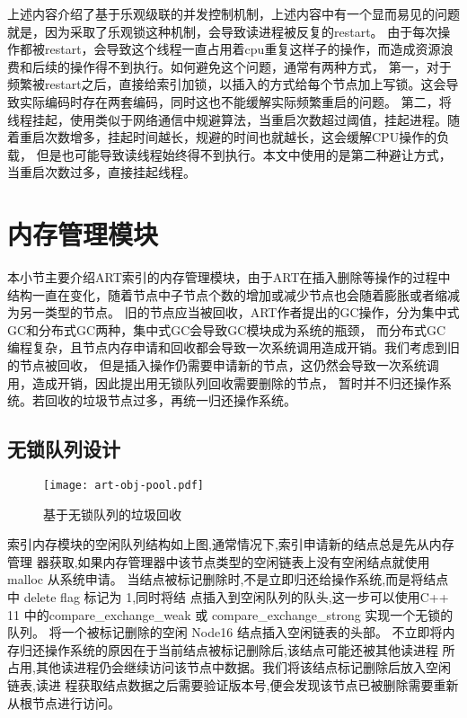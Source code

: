 上述内容介绍了基于乐观级联的并发控制机制，上述内容中有一个显而易见的问题就是，因为采取了乐观锁这种机制，会导致读进程被反复的restart。
由于每次操作都被restart，会导致这个线程一直占用着cpu重复这样子的操作，而造成资源浪费和后续的操作得不到执行。如何避免这个问题，通常有两种方式，
第一，对于频繁被restart之后，直接给索引加锁，以插入的方式给每个节点加上写锁。这会导致实际编码时存在两套编码，同时这也不能缓解实际频繁重启的问题。
第二，将线程挂起，使用类似于网络通信中规避算法，当重启次数超过阈值，挂起进程。随着重启次数增多，挂起时间越长，规避的时间也就越长，这会缓解CPU操作的负载，
但是也可能导致读线程始终得不到执行。本文中使用的是第二种避让方式，当重启次数过多，直接挂起线程。

\section{内存管理模块}
本小节主要介绍ART索引的内存管理模块，由于ART在插入删除等操作的过程中结构一直在变化，随着节点中子节点个数的增加或减少节点也会随着膨胀或者缩减为另一类型的节点。
旧的节点应当被回收，ART作者提出的GC操作，分为集中式GC和分布式GC两种，集中式GC会导致GC模块成为系统的瓶颈，
而分布式GC 编程复杂，且节点内存申请和回收都会导致一次系统调用造成开销。我们考虑到旧的节点被回收，
但是插入操作仍需要申请新的节点，这仍然会导致一次系统调用，造成开销，因此提出用无锁队列回收需要删除的节点，
暂时并不归还操作系统。若回收的垃圾节点过多，再统一归还操作系统。

\subsection{无锁队列设计}

\begin{figure}[h]
  \centering
  \texttt{[image: art-obj-pool.pdf]}
  \caption{基于无锁队列的垃圾回收}
  \label{fig:art-obj-pool}
\end{figure}

索引内存模块的空闲队列结构如上图,通常情况下,索引申请新的结点总是先从内存管理
器获取,如果内存管理器中该节点类型的空闲链表上没有空闲结点就使用 malloc 从系统申请。
当结点被标记删除时,不是立即归还给操作系统,而是将结点中 delete flag 标记为 1,同时将结
点插入到空闲队列的队头,这一步可以使用C++ 11 中的compare\_exchange\_weak 或
compare\_exchange\_strong 实现一个无锁的队列。
将一个被标记删除的空闲 Node16 结点插入空闲链表的头部。
不立即将内存归还操作系统的原因在于当前结点被标记删除后,该结点可能还被其他读进程
所占用,其他读进程仍会继续访问该节点中数据。我们将该结点标记删除后放入空闲链表,读进
程获取结点数据之后需要验证版本号,便会发现该节点已被删除需要重新从根节点进行访问。

